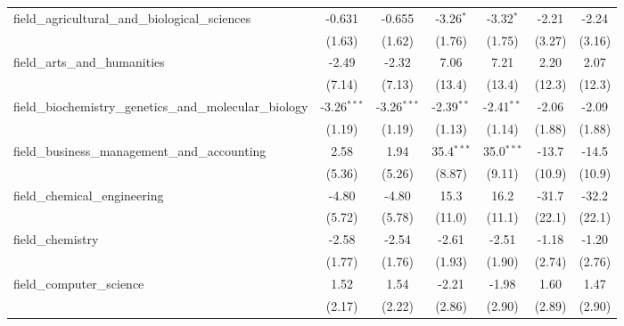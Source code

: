 \begin{tabular}{lcccccc}
   field\_agricultural\_and\_biological\_sciences              & -0.631        & -0.655        & -3.26$^{*}$  & -3.32$^{*}$   & -2.21          & -2.24\\   
                                                               & (1.63)        & (1.62)        & (1.76)       & (1.75)        & (3.27)         & (3.16)\\   
   field\_arts\_and\_humanities                                & -2.49         & -2.32         & 7.06         & 7.21          & 2.20           & 2.07\\   
                                                               & (7.14)        & (7.13)        & (13.4)       & (13.4)        & (12.3)         & (12.3)\\   
   field\_biochemistry\_genetics\_and\_molecular\_biology      & -3.26$^{***}$ & -3.26$^{***}$ & -2.39$^{**}$ & -2.41$^{**}$  & -2.06          & -2.09\\   
                                                               & (1.19)        & (1.19)        & (1.13)       & (1.14)        & (1.88)         & (1.88)\\   
   field\_business\_management\_and\_accounting                & 2.58          & 1.94          & 35.4$^{***}$ & 35.0$^{***}$  & -13.7          & -14.5\\   
                                                               & (5.36)        & (5.26)        & (8.87)       & (9.11)        & (10.9)         & (10.9)\\   
   field\_chemical\_engineering                                & -4.80         & -4.80         & 15.3         & 16.2          & -31.7          & -32.2\\   
                                                               & (5.72)        & (5.78)        & (11.0)       & (11.1)        & (22.1)         & (22.1)\\   
   field\_chemistry                                            & -2.58         & -2.54         & -2.61        & -2.51         & -1.18          & -1.20\\   
                                                               & (1.77)        & (1.76)        & (1.93)       & (1.90)        & (2.74)         & (2.76)\\   
   field\_computer\_science                                    & 1.52          & 1.54          & -2.21        & -1.98         & 1.60           & 1.47\\   
                                                               & (2.17)        & (2.22)        & (2.86)       & (2.90)        & (2.89)         & (2.90)\\   

\end{tabular}
